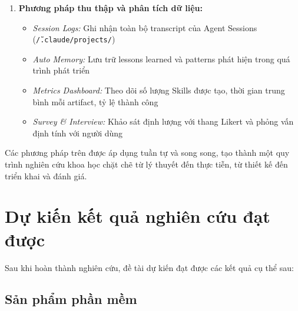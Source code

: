 \documentclass[13pt,a4paper,oneside]{extreport}
\numberwithin{equation}{chapter}
\numberwithin{figure}{chapter}
\numberwithin{table}{chapter}
\begin{document}
\begin{enumerate}
    \item \textbf{Phương pháp thu thập và phân tích dữ liệu:}
    \begin{itemize}
        \item \textit{Session Logs:} Ghi nhận toàn bộ transcript của Agent Sessions (\texttt{\~/.claude/projects/})
        \item \textit{Auto Memory:} Lưu trữ lessons learned và patterns phát hiện trong quá trình phát triển
        \item \textit{Metrics Dashboard:} Theo dõi số lượng Skills được tạo, thời gian trung bình mỗi artifact, tỷ lệ thành công
        \item \textit{Survey \& Interview:} Khảo sát định lượng với thang Likert và phỏng vấn định tính với người dùng
    \end{itemize}
\end{enumerate}

Các phương pháp trên được áp dụng tuần tự và song song, tạo thành một quy trình nghiên cứu khoa học chặt chẽ từ lý thuyết đến thực tiễn, từ thiết kế đến triển khai và đánh giá.

\section*{Dự kiến kết quả nghiên cứu đạt được}

Sau khi hoàn thành nghiên cứu, đề tài dự kiến đạt được các kết quả cụ thể sau:

\subsection*{Sản phẩm phần mềm}
\end{document}
